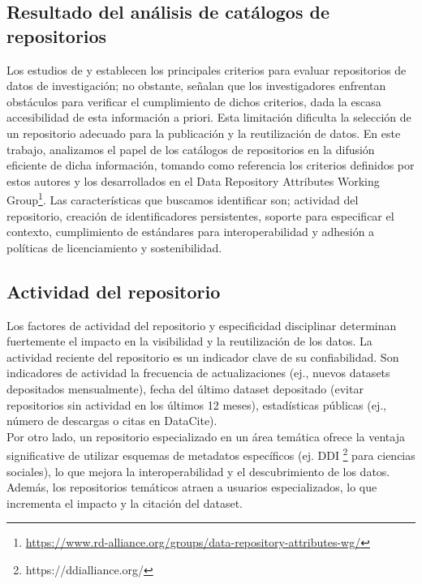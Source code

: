 \documentclass[runningheads]{llncs}
\begin{document}
\subsection{Resultado del análisis de catálogos de repositorios}
Los estudios de \citep{witt_2024_11221855} y \citep{Jia25} establecen los principales criterios para evaluar repositorios de datos de investigación; no obstante, señalan que los investigadores enfrentan obstáculos para verificar el cumplimiento de dichos criterios, dada la escasa accesibilidad de esta información a priori. Esta limitación dificulta la selección de un repositorio adecuado para la publicación y la reutilización de datos. En este trabajo, analizamos el papel de los catálogos de repositorios en la difusión eficiente de dicha información, tomando como referencia los criterios definidos por estos autores y los desarrollados en el Data Repository Attributes Working Group\footnote{\url{https://www.rd-alliance.org/groups/data-repository-attributes-wg/}}.
Las características que buscamos identificar son; actividad del repositorio, creación de identificadores persistentes, soporte para especificar el contexto, cumplimiento de estándares para interoperabilidad y adhesión a políticas de licenciamiento y sostenibilidad.

\subsection*{Actividad del repositorio}
Los factores de actividad del repositorio y especificidad disciplinar  determinan fuertemente el impacto en la visibilidad y la reutilización de los datos. 
La actividad reciente del repositorio es un indicador clave de su confiabilidad. Son indicadores de actividad la frecuencia de actualizaciones (ej., nuevos datasets depositados mensualmente), fecha del último dataset depositado (evitar repositorios sin actividad en los últimos 12 meses), estadísticas públicas (ej., número de descargas o citas en DataCite).\\

Por otro lado, un repositorio especializado en un área temática ofrece la ventaja significative de utilizar esquemas de metadatos específicos (ej. DDI \footnote{ https://ddialliance.org/} para ciencias sociales), lo que mejora la interoperabilidad y el descubrimiento de los datos. Además, los repositorios temáticos atraen a usuarios especializados, lo que incrementa el impacto y la citación del dataset.
\end{document}
